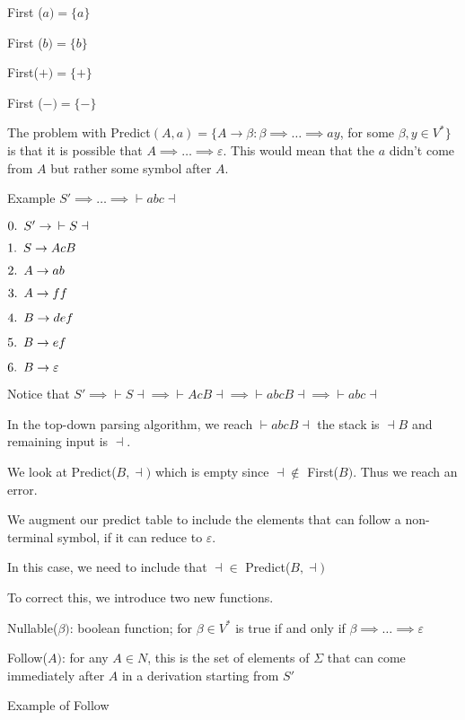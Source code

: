 \documentclass{article}
\begin{document}
First (\(a) = \{a\}\)

First (\(b) = \{b\}\)

First(\(+) = \{+\}\)

First (\(-) = \{-\}\)

The problem with
Predict\((A,a) = \{A \to \beta: \beta \implies \ldots \implies ay\), for
some \(\beta, y \in V^*\}\) is that it is possible that
\(A \implies \ldots \implies \varepsilon\). This would mean that the
\(a\) didn't come from \(A\) but rather some symbol after \(A\).

Example \(S' \implies \ldots \implies \vdash abc \dashv\)

\(0. \mkern9mu S' \to \mkern9mu \vdash S \dashv\)

\(1. \mkern9mu S \to AcB\)

\(2.\mkern9mu  A \to ab\)

\(3.\mkern9mu  A \to ff\)

\(4.\mkern9mu  B \to def\)

\(5. \mkern9mu B \to ef\)

\(6. \mkern9mu B \to \varepsilon\)

Notice that
\(S' \implies \vdash S \dashv \implies \vdash AcB \dashv \implies \vdash abcB \dashv \implies \vdash abc \dashv\)

In the top-down parsing algorithm, we reach \(\vdash abcB \dashv\) the
stack is \(\dashv B\) and remaining input is \(\dashv\).

We look at Predict(\(B, \dashv)\) which is empty since
\(\dashv \not \in\) First(\(B)\). Thus we reach an error.

We augment our predict table to include the elements that can follow a
non-terminal symbol, if it can reduce to \(\varepsilon\).

In this case, we need to include that \(\dashv \in\)
Predict(\(B, \dashv)\)

To correct this, we introduce two new functions.

Nullable(\(\beta)\): boolean function; for \(\beta \in V^*\) is true if
and only if \(\beta \implies \ldots \implies \varepsilon\)

Follow(\(A)\): for any \(A \in N\), this is the set of elements of
\(\Sigma\) that can come immediately after \(A\) in a derivation
starting from \(S'\)


Example of Follow
\end{document}
